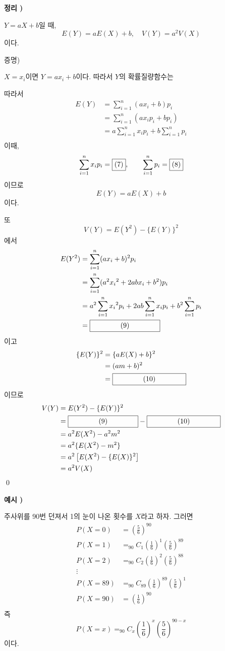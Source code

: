 \documentclass[a4paper]{oblivoir}
\newcounter{num}
\newcommand\theo[1]
{\bigskip\par\noindent\stepcounter{num} \textbf{정리 \thenum) #1}\par\noindent}
\newcommand\exam[1]
{\bigskip\par\noindent\stepcounter{num} \textbf{예시 \thenum) #1}\par\noindent}
\newcommand{\proo}
{\bigskip\textsf{증명)}\par}
\newcommand\summ{\ensuremath{\sum_{i=1}^n}}
\begin{document}
%
\begin{mdframed}
\theo{}
\(Y=aX+b\)일 때,
\[E(Y)=aE(X)+b,\quad V(Y)=a^2V(X)\]
이다.
\end{mdframed}

%
\proo{}
\(X=x_i\)이면 \(Y=ax_i+b\)이다.
따라서 \(Y\)의 확률질량함수는

\begin{center}
\end{center}

따라서
\begin{align*}
E(Y)
&=\summ(ax_i+b)p_i\\
&=\summ(ax_ip_i+bp_i)\\
&=a\summ x_ip_i+b\summ p_i\\
\end{align*}
이때,
\[\summ x_ip_i=\fbox{(7)},\qquad \summ p_i=\fbox{(8)}\]
이므로
\[E(Y)=aE(X)+b\]
이다.

\clearpage
또
\[V(Y)=E(Y^2)-\{E(Y)\}^2\]
에서
\begin{align*}
E(Y^2)
&=\summ(ax_i+b)^2p_i\\
&=\summ(a^2{x_i}^2+2abx_i+b^2)p_i\\
&=a^2\summ{x_i}^2p_i+2ab\summ x_ip_i+b^2\summ p_i\\
&=\fbox{\qquad\qquad(9)\qquad\qquad}
\end{align*}
이고
\begin{align*}
\{E(Y)\}^2
&=\{aE(X)+b\}^2\\
&=(am+b)^2\\
&=\fbox{\qquad\qquad(10)\qquad\qquad}
\end{align*}
이므로
\begin{align*}
V(Y)
&=E(Y^2)-\{E(Y)\}^2\\
&=\fbox{\qquad\qquad(9)\qquad\qquad}-\fbox{\qquad\qquad(10)\qquad\qquad}\\
&=a^2E(X^2)-a^2m^2\\
&=a^2\{E(X^2)-m^2\}\\
&=a^2\left[E(X^2)-\{E(X)\}^2\right]\\
&=a^2V(X)
\end{align*}
\qed

\clearpage
%
\exam{}
주사위를 90번 던져서 1의 눈이 나온 횟수를 \(X\)라고 하자.
그러면
\begin{align*}
P(X=0)&=\left(\frac56\right)^{90}\\
P(X=1)&=_{90}C_1\left(\frac16\right)^1\left(\frac56\right)^{89}\\
P(X=2)&=_{90}C_2\left(\frac16\right)^2\left(\frac56\right)^{88}\\
\vdots\\
P(X=89)&=_{90}C_{89}\left(\frac16\right)^{89}\left(\frac56\right)^1\\
P(X=90)&=\left(\frac16\right)^{90}\\
\end{align*}
즉
\[P(X=x)=_{90}C_x\left(\frac16\right)^x\left(\frac56\right)^{90-x}\]
이다.
\end{document}
